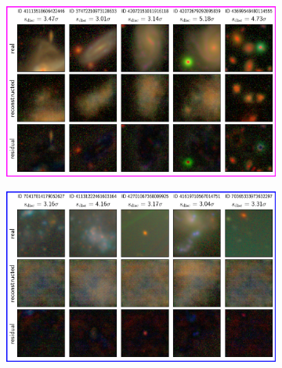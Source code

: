 \begin{figure}
\begin{subfigure}{.48\textwidth}
  \centering
  \includegraphics[width=1\linewidth]{recons_box_magenta.png}  
  \caption{}
  \label{fig:recons_magenta}
\end{subfigure}
\hspace{2em}
\begin{subfigure}{.48\textwidth}
  \centering
  \includegraphics[width=1\linewidth]{recons_box_blue}  
  \caption{}
  \label{fig:recons_blue}
\end{subfigure}


\end{figure}
